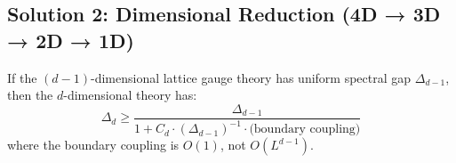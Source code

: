 \subsection{Solution 2: Dimensional Reduction (4D → 3D → 2D → 1D)}

\begin{theorem}
\label{thm:dim-reduction-rigorous}
If the $(d-1)$-dimensional lattice gauge theory has uniform spectral gap $\Delta_{d-1}$, 
then the $d$-dimensional theory has:
\[
\Delta_d \geq \frac{\Delta_{d-1}}{1 + C_d \cdot (\Delta_{d-1})^{-1} \cdot \text{(boundary coupling)}}
\]
where the boundary coupling is $O(1)$, not $O(L^{d-1})$.
\end{theorem}

